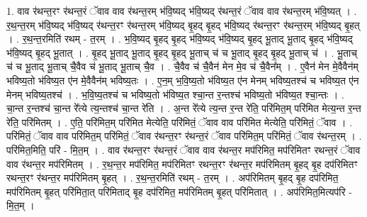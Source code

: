 \documentclass[17pt]{extarticle}
\begin{document}
1. वाव र॑थन्त॒रꣳ र॑थन्त॒रं ॅवाव वाव र॑थन्त॒रम् भ॑वि॒ष्यद् भ॑वि॒ष्यद् र॑थन्त॒रं ॅवाव वाव र॑थन्त॒रम् भ॑वि॒ष्यत् । . र॒थ॒न्त॒रम् भ॑वि॒ष्यद् भ॑वि॒ष्यद् र॑थन्त॒रꣳ र॑थन्त॒रम् भ॑वि॒ष्यद् बृ॒हद् बृ॒हद् भ॑वि॒ष्यद् र॑थन्त॒रꣳ र॑थन्त॒रम् भ॑वि॒ष्यद् बृ॒हत् । . र॒थ॒न्त॒रमिति॑ रथम् - त॒रम् । . भ॒वि॒ष्यद् बृ॒हद् बृ॒हद् भ॑वि॒ष्यद् भ॑वि॒ष्यद् बृ॒हद् भू॒ताद् भू॒ताद् बृ॒हद् भ॑वि॒ष्यद् भ॑वि॒ष्यद् बृ॒हद् भू॒तात् । . बृ॒हद् भू॒ताद् भू॒ताद् बृ॒हद् बृ॒हद् भू॒ताच् च॑ च भू॒ताद् बृ॒हद् बृ॒हद् भू॒ताच् च॑ । . भू॒ताच् च॑ च भू॒ताद् भू॒ताच् चै॒वैव च॑ भू॒ताद् भू॒ताच् चै॒व । . चै॒वैव च॑ चै॒वैन॑ मेन मे॒व च॑ चै॒वैन᳚म् । . ए॒वैन॑ मेन मे॒वैवैन॑म् भविष्य॒तो भ॑विष्य॒त ए॑न मे॒वैवैन॑म् भविष्य॒तः । . ए॒न॒म् भ॒वि॒ष्य॒तो भ॑विष्य॒त ए॑न मेनम् भविष्य॒तश्च॑ च भविष्य॒त ए॑न मेनम् भविष्य॒तश्च॑ । . भ॒वि॒ष्य॒तश्च॑ च भविष्य॒तो भ॑विष्य॒त श्चा॒न्त र॒न्तश्च॑ भविष्य॒तो भ॑विष्य॒त श्चा॒न्तः । . चा॒न्त र॒न्तश्च॑ चा॒न्त रे᳚त्ये त्य॒न्तश्च॑ चा॒न्त रे॑ति । . अ॒न्त रे᳚त्ये त्य॒न्त र॒न्त रे॑ति॒ परि॑मित॒म् परि॑मित मेत्य॒न्त र॒न्त रे॑ति॒ परि॑मितम् । . ए॒ति॒ परि॑मित॒म् परि॑मित मेत्येति॒ परि॑मितं॒ ॅवाव वाव परि॑मित मेत्येति॒ परि॑मितं॒ ॅवाव । . परि॑मितं॒ ॅवाव वाव परि॑मित॒म् परि॑मितं॒ ॅवाव र॑थन्त॒रꣳ र॑थन्त॒रं ॅवाव परि॑मित॒म् परि॑मितं॒ ॅवाव र॑थन्त॒रम् । . परि॑मित॒मिति॒ परि॑ - मि॒त॒म् । . वाव र॑थन्त॒रꣳ र॑थन्त॒रं ॅवाव वाव र॑थन्त॒र मप॑रिमित॒ मप॑रिमितꣳ रथन्त॒रं ॅवाव वाव र॑थन्त॒र मप॑रिमितम् । . र॒थ॒न्त॒र मप॑रिमित॒ मप॑रिमितꣳ रथन्त॒रꣳ र॑थन्त॒र मप॑रिमितम् बृ॒हद् बृ॒ह दप॑रिमितꣳ रथन्त॒रꣳ र॑थन्त॒र मप॑रिमितम् बृ॒हत् । . र॒थ॒न्त॒रमिति॑ रथम् - त॒रम् । . अप॑रिमितम् बृ॒हद् बृ॒ह दप॑रिमित॒ मप॑रिमितम् बृ॒हत् परि॑मिता॒त् परि॑मिताद् बृ॒ह दप॑रिमित॒ मप॑रिमितम् बृ॒हत् परि॑मितात् । . अप॑रिमित॒मित्यप॑रि - मि॒त॒म् । \newline
\end{document}
